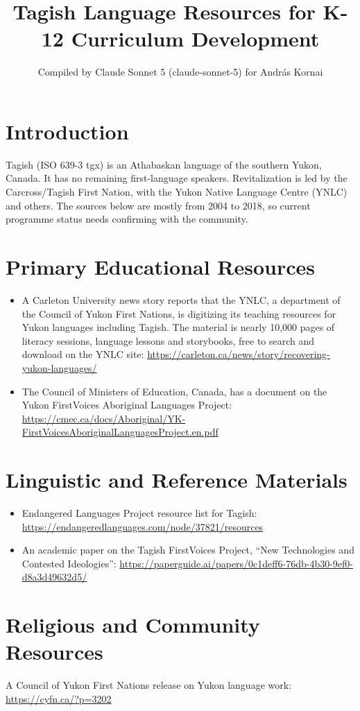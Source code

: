 \documentclass[12pt]{article}
\title{Tagish Language Resources for K-12 Curriculum Development}
\author{Compiled by Claude Sonnet 5 (claude-sonnet-5) for Andr\'as Kornai}
\date{}
\begin{document}
\maketitle

\section{Introduction}
Tagish (ISO 639-3 tgx) is an Athabaskan language of the southern Yukon, Canada. It has no remaining first-language speakers. Revitalization is led by the Carcross/Tagish First Nation, with the Yukon Native Language Centre (YNLC) and others. The sources below are mostly from 2004 to 2018, so current programme status needs confirming with the community.

\section{Primary Educational Resources}
\begin{itemize}
\item A Carleton University news story reports that the YNLC, a department of the Council of Yukon First Nations, is digitizing its teaching resources for Yukon languages including Tagish. The material is nearly 10,000 pages of literacy sessions, language lessons and storybooks, free to search and download on the YNLC site: \url{https://carleton.ca/news/story/recovering-yukon-languages/}
\item The Council of Ministers of Education, Canada, has a document on the Yukon FirstVoices Aboriginal Languages Project: \url{https://cmec.ca/docs/Aboriginal/YK-FirstVoicesAboriginalLanguagesProject.en.pdf}
\end{itemize}

\section{Linguistic and Reference Materials}
\begin{itemize}
\item Endangered Languages Project resource list for Tagish: \url{https://endangeredlanguages.com/node/37821/resources}
\item An academic paper on the Tagish FirstVoices Project, ``New Technologies and Contested Ideologies'': \url{https://paperguide.ai/papers/0c1deff6-76db-4b30-9ef0-d8a3d49632d5/}
\end{itemize}

\section{Religious and Community Resources}
A Council of Yukon First Nations release on Yukon language work: \url{https://cyfn.ca/?p=3202}
\end{document}
